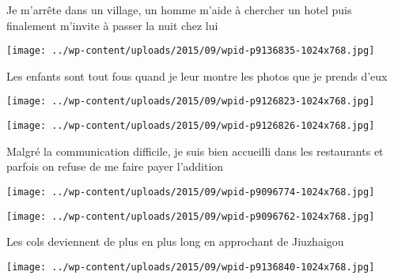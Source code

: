  

 Je m'arrête dans un village, un homme m'aide à chercher un hotel puis finalement m'invite à passer la nuit chez lui 

 

\begin{center} \texttt{[image: ../wp-content/uploads/2015/09/wpid-p9136835-1024x768.jpg]} \end{center}

 

 Les enfants sont tout fous quand je leur montre les photos que je prends d'eux 

 

\begin{center} \texttt{[image: ../wp-content/uploads/2015/09/wpid-p9126823-1024x768.jpg]} \end{center}

 

 

\begin{center} \texttt{[image: ../wp-content/uploads/2015/09/wpid-p9126826-1024x768.jpg]} \end{center}

 

 Malgré la communication difficile, je suis bien accueilli dans les restaurants et parfois on refuse de me faire payer l'addition 

 

\begin{center} \texttt{[image: ../wp-content/uploads/2015/09/wpid-p9096774-1024x768.jpg]} \end{center}

 

 

\begin{center} \texttt{[image: ../wp-content/uploads/2015/09/wpid-p9096762-1024x768.jpg]} \end{center}

 

 Les cols deviennent de plus en plus long en approchant de Jiuzhaigou 

 

\begin{center} \texttt{[image: ../wp-content/uploads/2015/09/wpid-p9136840-1024x768.jpg]} \end{center}

 

 

